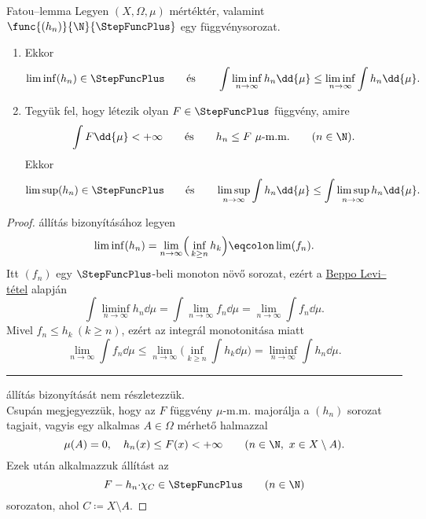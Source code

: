 \documentclass[
]{elteikthesis}[2024/04/26]
\begin{document}
	\begin{lemma}{Fatou--lemma}{}
		Legyen \( (X, \Omega, \mu) \) mértéktér, 
		valamint \( \func{(h_n)}{\N}{\StepFuncPlus} \) egy függvénysorozat.
		\begin{enumerate}[label=\alph*)]
			\item\label{eq:fatou-01}
			Ekkor
			\[
				\liminf(h_n) \in \StepFuncPlus
				\qquad \text{és} \qquad
				\int \liminf_{n \to \infty} h_n \dd{\mu} \leq 
				\liminf_{n \to \infty} \int h_n \dd{\mu}.
			\]
			
			\item\label{eq:fatou-02}
			Tegyük fel, hogy létezik olyan \( F \in \StepFuncPlus \) függvény, amire
			\[
				\int F \dd{\mu} < +\infty
				\qquad \text{és} \qquad
				h_n \leq F \ \mu \text{-m.m.} \qquad (n \in \N).
			\]
			Ekkor
			\[
				\limsup(h_n) \in \StepFuncPlus
				\qquad \text{és} \qquad
				\limsup_{n \to \infty} \int h_n \dd{\mu} \leq 
				\int \limsup_{n \to \infty} h_n \dd{\mu}.
			\]
		\end{enumerate}
	\end{lemma}
	
	\begin{proof}
		 állítás bizonyításához legyen
		\[
			\liminf(h_n) = 
			\lim_{n \to \infty} \Bigl( \,\inf_{k \geq n} h_k \Bigr) \eqcolon
			\lim( f_n ).
		\]
		Itt \( (f_n) \) egy \( \StepFuncPlus \)-beli monoton növő sorozat, 
		ezért a \hyperref[th:beppo-levi]{Beppo Levi--tétel} alapján
		\[
			\int \liminf_{n \to \infty} h_n \dd{\mu} =
			\int \lim_{n \to \infty} f_n \dd{\mu} =
			\lim_{n \to \infty} \int f_n \dd{\mu}.
		\]
		Mivel \( f_n \leq h_k \ (k \geq n) \),
		ezért az integrál monotonitása miatt
		\[
			\lim_{n \to \infty} \int f_n \dd{\mu} \leq
			\lim_{n \to \infty} \biggl( \inf_{k \geq n} \int h_k \dd{\mu} \biggr) =
			\liminf_{n \to \infty} \int h_n \dd{\mu}.
		\]
		
		\vspace{6pt}
		\hrule
		\vspace{9pt}
		
		 állítás bizonyítását nem részletezzük.\\[6pt]
		Csupán megjegyezzük, hogy az \( F \) függvény \( \mu \)-m.m. majorálja a \( (h_n) \) sorozat tagjait, vagyis egy alkalmas \( A \in \Omega \) mérhető halmazzal
		\[
			\mu(A) = 0, \quad 
			h_n(x) \leq F(x) < +\infty \qquad (n \in \N, \ x \in X \setminus A).
		\]
		Ezek után alkalmazzuk  állítást az
		\[
			F - h_n {\cdot} \chi_C \in \StepFuncPlus \qquad (n \in \N)
		\]
		sorozaton, ahol \( C \coloneq X \setminus A \).
	\end{proof}
	
	
	
\end{document}
